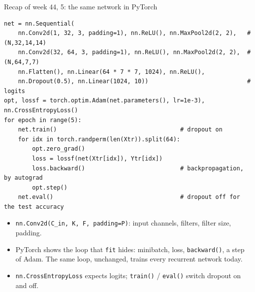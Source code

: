 \documentclass[10pt,aspectratio=169]{beamer}
\begin{document}
\begin{frame}[fragile]{Recap of week 44, 5: the same network in PyTorch}
\begin{lstlisting}[basicstyle=\ttfamily\tiny]
net = nn.Sequential(
    nn.Conv2d(1, 32, 3, padding=1), nn.ReLU(), nn.MaxPool2d(2, 2),   # (N,32,14,14)
    nn.Conv2d(32, 64, 3, padding=1), nn.ReLU(), nn.MaxPool2d(2, 2),  # (N,64,7,7)
    nn.Flatten(), nn.Linear(64 * 7 * 7, 1024), nn.ReLU(),
    nn.Dropout(0.5), nn.Linear(1024, 10))                            # logits
opt, lossf = torch.optim.Adam(net.parameters(), lr=1e-3), nn.CrossEntropyLoss()
for epoch in range(5):
    net.train()                                   # dropout on
    for idx in torch.randperm(len(Xtr)).split(64):
        opt.zero_grad()
        loss = lossf(net(Xtr[idx]), Ytr[idx])
        loss.backward()                           # backpropagation, by autograd
        opt.step()
    net.eval()                                    # dropout off for the test accuracy
\end{lstlisting}
\small
\begin{itemize}
  \item \texttt{nn.Conv2d(C\_in, K, F, padding=P)}: input channels, filters,
        filter size, padding.
  \item PyTorch shows the loop that \texttt{fit} hides: minibatch, loss,
        \texttt{backward()}, a step of Adam.  The same loop, unchanged,
        trains every recurrent network today.
  \item \texttt{nn.CrossEntropyLoss} expects logits; \texttt{train()} /
        \texttt{eval()} switch dropout on and off.
\end{itemize}
\end{frame}
\end{document}
